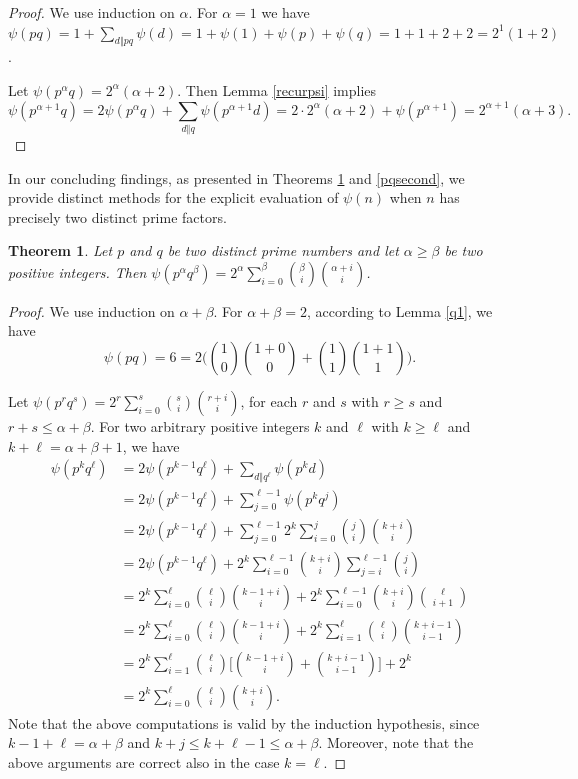 \documentclass{amsart}
\newtheorem{theorem}{Theorem}[section]
\theoremstyle{definition}
\begin{document}
\begin{proof}
We use induction on $\alpha$. For $\alpha=1$ we have $\psi(pq)=1+\sum_{d\Vert pq}\psi(d)=1+\psi(1)+\psi(p)+\psi(q)=1+1+2+2=2^1(1+2)$. 

Let $\psi(p^\alpha q)=2^\alpha(\alpha+2)$. Then Lemma \ref{recurpsi} implies
\[\psi(p^{\alpha+1}q)=2\psi(p^\alpha q)+\sum_{d\Vert q}\psi(p^{\alpha+1}d)=2\cdot2^\alpha(\alpha+2)+\psi(p^{\alpha+1}) =2^{\alpha+1}(\alpha+3).\]
\end{proof}

In our concluding findings, as presented in Theorems \ref{pqfirst} and \ref{pqsecond}, we provide distinct methods for the explicit evaluation of $\psi(n)$ when $n$ has precisely two distinct prime factors. 

\begin{theorem}\label{pqfirst}
Let $p$ and $q$ be two distinct prime numbers and let $\alpha\geqslant \beta$ be two positive integers. Then $\psi(p^\alpha q^\beta)=2^\alpha \sum_{i=0}^\beta \binom{\beta}{i}\binom{\alpha+i}{i}$.
\end{theorem}

\begin{proof}
We use induction on $\alpha+\beta$. For $\alpha+\beta=2$, according to Lemma \ref{q1}, we have 
\[\psi(pq)=6= 2\Big(\binom{1}{0}\binom{1+0}{0}+\binom{1}{1}\binom{1+1}{1}\Big).\] 

Let $\psi(p^r q^s)=2^r \sum_{i=0}^s \binom{s}{i}\binom{r+i}{i}$, for each $r$ and $s$ with $r\geqslant s$ and $r+s\leqslant\alpha+\beta$. For two arbitrary positive integers $k$ and $\ell$ with $k\geqslant\ell$ and $k+\ell=\alpha+\beta+1$, we have
\begin{align*}
\psi(p^kq^\ell)&=2\psi(p^{k-1} q^{\ell})+\sum_{d\Vert q^{\ell}}\psi(p^{k}d)\\
&=2\psi(p^{k-1} q^{\ell})+\sum_{j=0}^{\ell-1}\psi(p^k q^j) \\
&=2\psi(p^{k-1} q^{\ell}) +\sum_{j=0}^{\ell-1}2^k\sum_{i=0}^j\binom{j}{i}\binom{k+i}{i}\\
&=2\psi(p^{k-1} q^{\ell}) +2^k\sum_{i=0}^{\ell-1}\binom{k+i}{i}\sum_{j=i}^{\ell-1}\binom{j}{i}\\
&=2^k\sum_{i=0}^\ell\binom{\ell}{i}\binom{k-1+i}{i} +2^k\sum_{i=0}^{\ell-1}\binom{k+i}{i}\binom{\ell}{i+1}\\
&=2^k\sum_{i=0}^\ell\binom{\ell}{i}\binom{k-1+i}{i} +2^k\sum_{i=1}^{\ell}\binom{\ell}{i}\binom{k+i-1}{i-1}\\
&=2^k\sum_{i=1}^\ell\binom{\ell}{i}\Big[\binom{k-1+i}{i} +\binom{k+i-1}{i-1}\Big]+2^k\\
&=2^k\sum_{i=0}^\ell\binom{\ell}{i}\binom{k+i}{i}.
\end{align*}
Note that the above computations is valid by the induction hypothesis, since $k-1+\ell=\alpha+\beta$ and $k+j\leqslant k+\ell-1\leqslant \alpha+\beta$. Moreover, note that the above arguments are correct also in the case $k=\ell$.
\end{proof}
\end{document}
